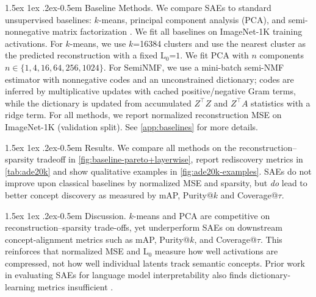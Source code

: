 \documentclass[runningheads]{llncs}
\makeatletter
\renewcommand{\paragraph}{%
  \@startsection{paragraph}{4}%
  {\z@}{1.5ex \@plus 1ex \@minus .2ex}{-0.5em}%
  {\normalfont\normalsize\bfseries}%
}
\makeatother
\begin{document}
\paragraph{Baseline Methods.}
We compare SAEs to standard unsupervised baselines: $k$-means, principal component analysis (PCA), and semi-nonnegative matrix factorization \citep[SemiNMF;][]{ding2008convex}.
We fit all baselines on ImageNet-1K training activations.
For $k$-means, we use $k$=\num{16384} clusters and use the nearest cluster as the predicted reconstruction with a fixed L$_0$=$1$.
We fit PCA with $n$ components $n \in \{1,4,16,64,256,1024\}$.
For SemiNMF, we use a mini-batch semi-NMF estimator with nonnegative codes and an unconstrained dictionary; codes are inferred by multiplicative updates with cached positive/negative Gram terms, while the dictionary is updated from accumulated $Z^\top Z$ and $Z^\top A$ statistics with a ridge term.
For all methods, we report normalized reconstruction MSE on ImageNet-1K (validation split).
See \cref{app:baselines} for more details.

\paragraph{Results.}
We compare all methods on the reconstruction--sparsity tradeoff in \cref{fig:baseline-pareto+layerwise}, report rediscovery metrics in \cref{tab:ade20k} and show qualitative examples in \cref{fig:ade20k-examples}.
SAEs do not improve upon classical baselines by normalized MSE and sparsity, but \textit{do} lead to better concept discovery as measured by mAP, Purity@$k$ and Coverage@$\tau$.

\paragraph{Discussion.}
$k$-means and PCA are competitive on reconstruction--sparsity trade-offs, yet underperform SAEs on downstream concept-alignment metrics such as mAP, Purity@$k$, and Coverage@$\tau$. 
This reinforces that normalized MSE and L$_0$ measure how well activations are compressed, not how well individual latents track semantic concepts.
Prior work in evaluating SAEs for language model interpretability also finds dictionary-learning metrics insufficient \citep{karvonen2025saebench}.
\end{document}
